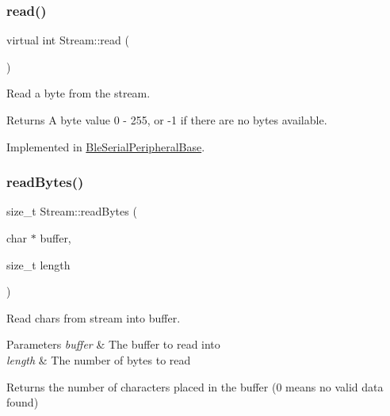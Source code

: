 \mbox{\label{class_stream_aea5dee9fcb038148515b7c9212d38dc0}} 
\subsubsection{\texorpdfstring{read()}{read()}}
{\footnotesize\ttfamily virtual int Stream\+::read (\begin{DoxyParamCaption}{ }\end{DoxyParamCaption})\hspace{0.3cm}{\ttfamily [pure virtual]}}



Read a byte from the stream. 

\begin{DoxyReturn}{Returns}
A byte value 0 -\/ 255, or -\/1 if there are no bytes available. 
\end{DoxyReturn}


Implemented in \mbox{\hyperlink{class_ble_serial_peripheral_base_a4933bc35d89028134597b46315806ce4}{Ble\+Serial\+Peripheral\+Base}}.

\mbox{\label{class_stream_a45fd1336a323ea83b16e8507055f44ea}} 
\subsubsection{\texorpdfstring{read\+Bytes()}{readBytes()}}
{\footnotesize\ttfamily size\+\_\+t Stream\+::read\+Bytes (\begin{DoxyParamCaption}\item[{char $\ast$}]{buffer,  }\item[{size\+\_\+t}]{length }\end{DoxyParamCaption})}



Read chars from stream into buffer. 


\begin{DoxyParams}{Parameters}
{\em buffer} & The buffer to read into \\
\hline
{\em length} & The number of bytes to read \\
\hline
\end{DoxyParams}
\begin{DoxyReturn}{Returns}
the number of characters placed in the buffer (0 means no valid data found) 
\end{DoxyReturn}
\mbox{\label{class_stream_af84672a4fb2620466958d3118d4fea00}} 
